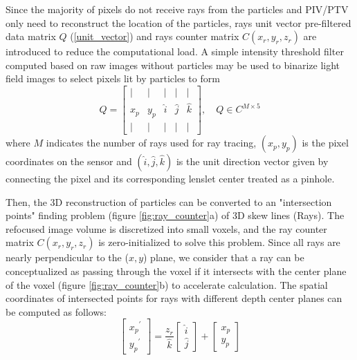 \documentclass[draftthesis,fullpage]{uiucthesis}
\begin{document}
Since the majority of pixels do not receive rays from the particles and PIV/PTV only need to reconstruct the location of the particles, rays unit vector pre-filtered data matrix $Q$ (\autoref{unit_vector}) and rays counter matrix $C(x_r,y_r,z_r)$ are introduced to reduce the computational load. A simple intensity threshold filter computed based on raw images without particles 
may be used to binarize light field images to select pixels lit by particles to form
\begin{equation}
       Q=\left[\begin{array}{ccccc}
       \mid & \mid & \mid & \mid & \mid \\
       x_p & y_p & \hat{i} & \hat{j} & \hat{k} \\
       \mid & \mid & \mid & \mid & \mid
       \end{array}\right], \quad Q \in C^{M \times 5}
       \label{unit_vector}
\end{equation}
where $M$ indicates the number of rays used for ray tracing, $(x_p, y_p)$ is the pixel coordinates on the sensor and $(\hat{i}, \hat{j}, \hat{k})$ is the unit direction vector given by connecting the pixel and its corresponding lenslet center treated as a pinhole.

Then, the 3D reconstruction of particles can be converted to an "intersection points" finding problem (figure \ref{fig:ray_counter}a) of 3D skew lines (Rays). The refocused image volume is discretized into small voxels, and the ray counter matrix $C(x_r,y_r,z_r)$ is zero-initialized to solve this problem. Since all rays are nearly perpendicular to the ($x,y$) plane, we consider that a ray can be conceptualized as passing through the voxel if it intersects with the center plane of the voxel (figure \ref{fig:ray_counter}b) to accelerate calculation. The spatial coordinates of intersected points for rays with different depth center planes can be computed as follows:
\begin{equation}
  \left[\begin{array}{c}
    {x_p}^{\prime} \\
    {y_p}^{\prime}
    \end{array}\right]=\frac{z_r}{\hat{k}}\left[\begin{array}{c}
    \hat{i} \\
    \hat{j}
    \end{array}\right] + 
    \left[\begin{array}{c}
    x_p \\
    y_p
    \end{array}\right]
  \label{eq:intersection}
\end{equation}
\end{document}
